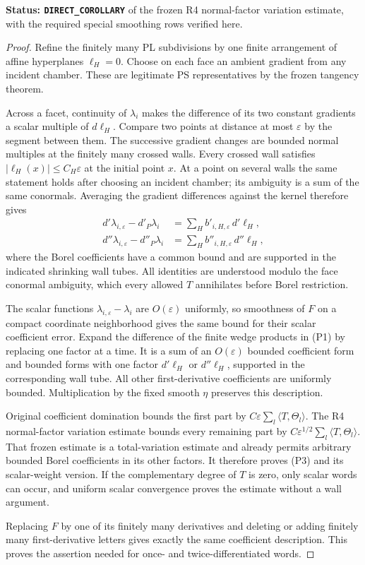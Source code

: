 \noindent\textbf{Status: \texttt{DIRECT\_COROLLARY}} of the
frozen R4 normal-factor variation estimate, with the required
special smoothing rows verified here.

\begin{proof}
Refine the finitely many PL subdivisions by one finite arrangement
of affine hyperplanes $\ell_H=0$.  Choose on each face an ambient
gradient from any incident chamber.  These are legitimate PS
representatives by the frozen tangency theorem.

Across a facet, continuity of $\lambda_i$ makes the difference
of its two constant gradients a scalar multiple of $d\ell_H$.
Compare two points at distance at most $\varepsilon$ by the
segment between them.  The successive gradient changes are
bounded normal multiples at the finitely many crossed walls.
Every crossed wall satisfies $|\ell_H(x)|\le C_H\varepsilon$
at the initial point $x$.  At a point on several walls the
same statement holds after choosing an incident chamber; its
ambiguity is a sum of the same conormals.  Averaging the
gradient differences against the kernel therefore gives
\[
 \begin{split}
 d'\lambda_{i,\varepsilon}-d'_P\lambda_i
       &=\sum_H b'_{i,H,\varepsilon}\,d'\ell_H,\\
 d''\lambda_{i,\varepsilon}-d''_P\lambda_i
       &=\sum_H b''_{i,H,\varepsilon}\,d''\ell_H,
 \end{split}
 \tag{P4}
\]
where the Borel coefficients have a common bound and are supported
in the indicated shrinking wall tubes.  All identities are
understood modulo the face conormal ambiguity, which every
allowed $T$ annihilates before Borel restriction.

The scalar functions $\lambda_{i,\varepsilon}-\lambda_i$ are
$O(\varepsilon)$ uniformly, so smoothness of $F$ on a compact
coordinate neighborhood gives the same bound for their scalar
coefficient error.  Expand the difference of the finite wedge
products in (P1) by replacing one factor at a time.  It is a sum
of an $O(\varepsilon)$ bounded coefficient form and bounded
forms with one factor $d'\ell_H$ or $d''\ell_H$, supported in
the corresponding wall tube.  All other first-derivative
coefficients are uniformly bounded.  Multiplication by the fixed
smooth $\eta$ preserves this description.

Original coefficient domination bounds the first part by
$C\varepsilon\sum_l\langle T,\Theta_l\rangle$.  The R4
normal-factor variation estimate bounds every remaining part by
$C\varepsilon^{1/2}\sum_l\langle T,\Theta_l\rangle$.
That frozen estimate is a total-variation estimate and already
permits arbitrary bounded Borel coefficients in its other
factors.  It therefore proves (P3) and its scalar-weight version.
If the complementary degree of $T$ is zero, only scalar words
can occur, and uniform scalar convergence proves the estimate
without a wall argument.

Replacing $F$ by one of its finitely many derivatives and
deleting or adding finitely many first-derivative letters gives
exactly the same coefficient description.  This proves the
assertion needed for once- and twice-differentiated words.
\end{proof}

